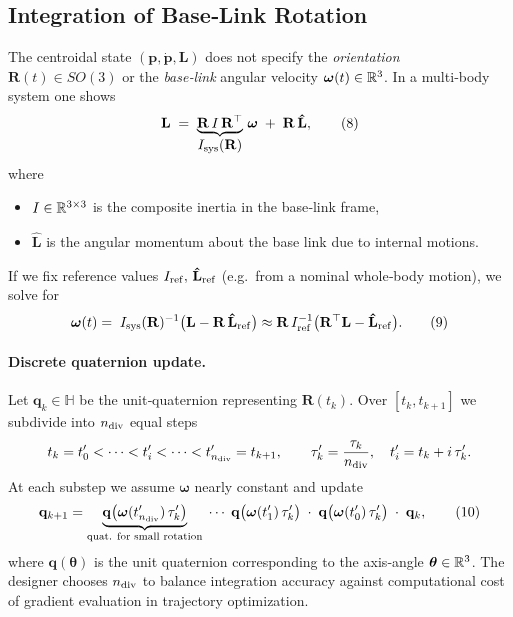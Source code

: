 \documentclass[main.tex]{subfiles}
\begin{document}
\begin{sloppypar}
\bigskip
\subsection{Integration of Base‐Link Rotation}

The centroidal state $(\mathbf{p},\dot{\mathbf{p}},\mathbf{L})$ does not specify the \emph{orientation} $\mathbf{R}(t)\in SO(3)$ or the \emph{base‐link} angular velocity $\boldsymbol{\omega}(t)\in\Bbb R^3$.  In a multi‐body system one shows
\[
\mathbf{L} \;=\; \underbrace{\mathbf{R}\,I\,\mathbf{R}^\top}_{\displaystyle I_{\rm sys}(\mathbf{R})}\,\boldsymbol{\omega}
\;+\;\mathbf{R}\,\mathbf{\hat{L}},
\tag{8}
\]
where
\begin{itemize}
  \item $I\in\Bbb R^{3\times3}$ is the composite inertia in the base‐link frame,
  \item $\mathbf{\hat{L}}$ is the angular momentum about the base link due to internal motions.
\end{itemize}
If we fix reference values $I_{\rm ref},\,\mathbf{\hat{L}}_{\rm ref}$ (e.g.\ from a nominal whole‐body motion), we solve for
\[
\boldsymbol{\omega}(t)
= \;I_{\rm sys}(\mathbf{R})^{-1}\bigl(\mathbf{L} - \mathbf{R}\,\mathbf{\hat{L}}_{\rm ref}\bigr)
\approx \mathbf{R}\,I_{\rm ref}^{-1}\bigl(\mathbf{R}^\top \mathbf{L} - \mathbf{\hat{L}}_{\rm ref}\bigr).
\tag{9}
\]

\paragraph{Discrete quaternion update.}
Let $\mathbf{q}_k\in\mathbb{H}$ be the unit‐quaternion representing $\mathbf{R}(t_k)$.
Over $[t_k,t_{k+1}]$ we subdivide into $n_{\rm div}$ equal steps
\[
t_k = t'_0 < \cdots < t'_i < \cdots < t'_{n_{\rm div}} = t_{k+1},\qquad
\tau_k' = \frac{\tau_k}{n_{\rm div}},\quad
t'_i = t_k + i\,\tau_k'.
\]
At each substep we assume $\boldsymbol{\omega}$ nearly constant and update
\[
\mathbf{q}_{k+1}
= \underbrace{\mathbf{q}\bigl(\boldsymbol{\omega}(t'_{n_{\rm div}})\,\tau_k'\bigr)}
_{\text{quat. for small rotation}}
\;\cdots\;
\mathbf{q}\bigl(\boldsymbol{\omega}(t'_1)\,\tau_k'\bigr)\;\cdot\;
\mathbf{q}\bigl(\boldsymbol{\omega}(t'_0)\,\tau_k'\bigr)\;\cdot\;\mathbf{q}_k,
\tag{10}
\]
where $\mathbf{q}(\boldsymbol{\theta})$ is the unit quaternion corresponding to the axis‐angle $\boldsymbol{\theta}\in\Bbb R^3$.  The designer chooses $n_{\rm div}$ to balance integration accuracy against computational cost of gradient evaluation in trajectory optimization.
\end{sloppypar}
\end{document}
